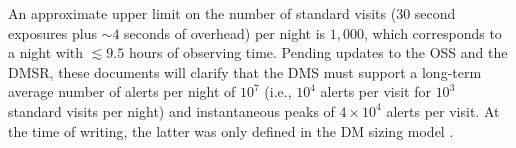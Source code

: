 \documentclass[DM,authoryear,toc]{lsstdoc}
\begin{document}

An approximate upper limit on the number of standard visits ($30$ second exposures plus $\sim4$ seconds of overhead) per night is $1,000$, which corresponds to a night with $\lesssim9.5$ hours of observing time. Pending updates to the OSS and the DMSR, these documents will clarify that the DMS must support a long-term average number of alerts per night of $10^7$ (i.e., $10^4$ alerts per visit for $10^3$ standard visits per night) and instantaneous peaks of $4\times10^4$ alerts per visit. At the time of writing, the latter was only defined in the DM sizing model .

\end{document}
